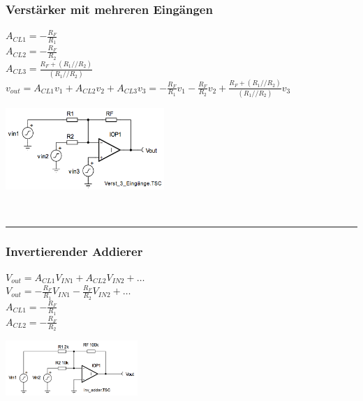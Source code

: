 		\begin{minipage}{12.5cm}
		\subsubsection{Verstärker mit mehreren Eingängen}
            	$A_{CL1}=-\frac{R_F}{R_1}$\\
            	$A_{CL2}=-\frac{R_F}{R_2}$\\
            	$A_{CL3}=\frac{R_F+(R_1//R_2)}{(R_1//R_2)}$\\
            	$v_{out}=A_{CL1}v_1+A_{CL2}v_2+A_{CL3}v_3=
            	-\frac{R_F}{R_1}v_1-\frac{R_F}{R_2}v_2+\frac{R_F+(R_1//R_2)}{(R_1//R_2)}v_3$\\
     	\end{minipage}
		\begin{minipage}{6cm}
      		\includegraphics[width=6cm]{./images/3-eingaenge.png}
      	\end{minipage}\\
\hrule

		\begin{minipage}[c]{12cm}
		\subsubsection{Invertierender Addierer}
            $V_{out}=A_{CL1}V_{IN1}+A_{CL2}V_{IN2}+\ldots$\\
            $V_{out}=- \frac{R_F}{R_1}V_{IN1}- \frac{R_F}{R_2}V_{IN2}+\ldots$\\
            $A_{CL1}=- \frac{R_F}{R_1}$\\
           	$A_{CL2}=- \frac{R_F}{R_2}$\\
      	\end{minipage}
		\begin{minipage}{5cm}
      		\includegraphics[width=5cm]{./images/invertadd.png}
      	\end{minipage}\\

